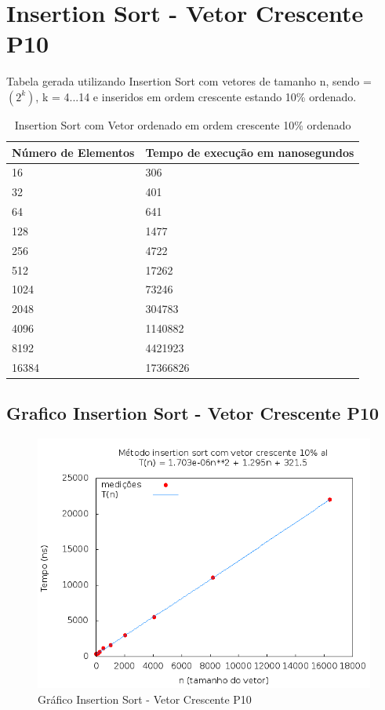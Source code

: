 \documentclass[12pt,a4paper,twoside]{report}
\begin{document}
\section{Insertion Sort - Vetor Crescente P10}
Tabela gerada utilizando Insertion Sort com vetores de tamanho n, sendo = $(2^k)$, k = 4...14 e inseridos em ordem crescente estando 10\% ordenado.

\begin{table}[H]
\centering
\caption{Insertion Sort com Vetor ordenado em ordem crescente 10\% ordenado}
\label{my-label}
\begin{tabular}{|l|l|}
\hline
\multicolumn{1}{|c|}{\textbf{Número de Elementos}} & \multicolumn{1}{c|}{\textbf{Tempo de execução em nanosegundos}} \\ \hline
16 & 306 \\ \hline
32 & 401 \\ \hline
64 & 641 \\ \hline
128 & 1477 \\ \hline
256 & 4722 \\ \hline
512 & 17262 \\ \hline
1024 & 73246 \\ \hline
2048 & 304783 \\ \hline
4096 & 1140882 \\ \hline
8192 & 4421923 \\ \hline
16384 & 17366826 \\ \hline
\end{tabular}
\end{table}

\subsection{Grafico Insertion Sort - Vetor Crescente P10}
\begin{figure}[H]
    \centering
    \includegraphics[width=0.7\linewidth]{graficos/Insertion/vIntCrescenteP10/vIntCrescenteP10.png}
  \caption{Gráfico Insertion Sort - Vetor Crescente P10}
\end{figure}
\end{document}
